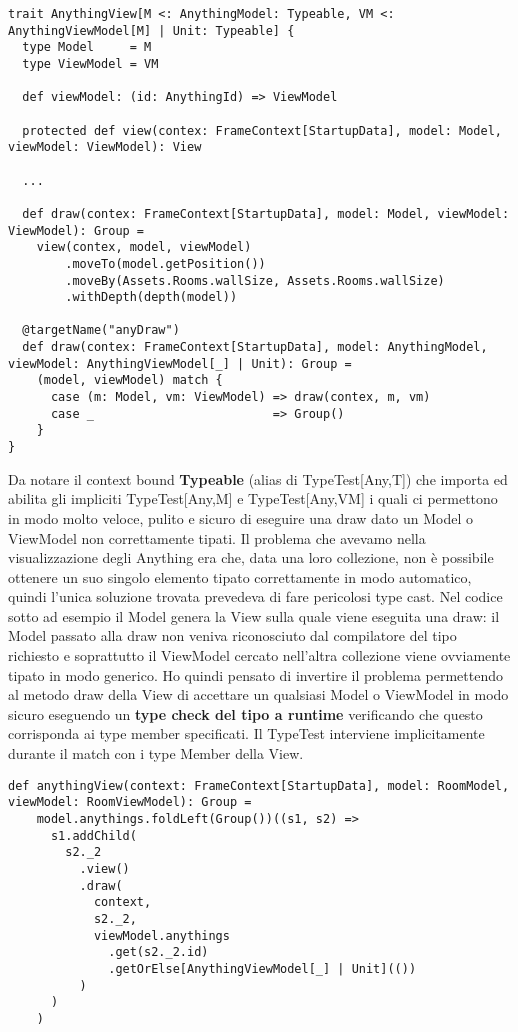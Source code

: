 \begin{lstlisting}[basicstyle=\tiny]
trait AnythingView[M <: AnythingModel: Typeable, VM <: AnythingViewModel[M] | Unit: Typeable] {
  type Model     = M
  type ViewModel = VM

  def viewModel: (id: AnythingId) => ViewModel

  protected def view(contex: FrameContext[StartupData], model: Model, viewModel: ViewModel): View
  
  ...

  def draw(contex: FrameContext[StartupData], model: Model, viewModel: ViewModel): Group =
    view(contex, model, viewModel)
        .moveTo(model.getPosition())
        .moveBy(Assets.Rooms.wallSize, Assets.Rooms.wallSize)
        .withDepth(depth(model))

  @targetName("anyDraw")
  def draw(contex: FrameContext[StartupData], model: AnythingModel, viewModel: AnythingViewModel[_] | Unit): Group =
    (model, viewModel) match {
      case (m: Model, vm: ViewModel) => draw(contex, m, vm)
      case _                         => Group()
    }
}
\end{lstlisting}

Da notare il context bound \textbf{Typeable} (alias di TypeTest[Any,T]) che importa ed abilita gli impliciti TypeTest[Any,M] e TypeTest[Any,VM] i quali ci permettono in modo molto veloce, pulito e sicuro di eseguire una draw dato un Model o ViewModel non correttamente tipati.
Il problema che avevamo nella visualizzazione degli Anything era che, data una loro collezione, non è possibile ottenere un suo singolo elemento tipato correttamente in modo automatico, quindi l'unica soluzione trovata prevedeva di fare pericolosi type cast.
Nel codice sotto ad esempio il Model genera la View sulla quale viene eseguita una draw: il Model passato alla draw non veniva riconosciuto dal compilatore del tipo richiesto e soprattutto il ViewModel cercato nell'altra collezione viene ovviamente tipato in modo generico. 
Ho quindi pensato di invertire il problema permettendo al metodo draw della View di accettare un qualsiasi Model o ViewModel in modo sicuro eseguendo un \textbf{type check del tipo a runtime} verificando che questo corrisponda ai type member specificati.
Il TypeTest interviene implicitamente durante il match con i type Member della View.

\begin{lstlisting}[basicstyle=\tiny]
def anythingView(context: FrameContext[StartupData], model: RoomModel, viewModel: RoomViewModel): Group =
    model.anythings.foldLeft(Group())((s1, s2) =>
      s1.addChild(
        s2._2
          .view()
          .draw(
            context,
            s2._2,
            viewModel.anythings
              .get(s2._2.id)
              .getOrElse[AnythingViewModel[_] | Unit](())
          )
      )
    )
\end{lstlisting}   

